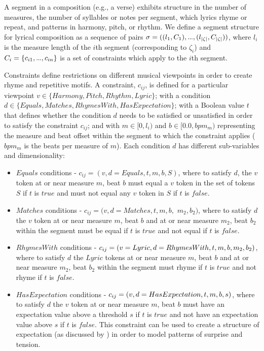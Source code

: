 \documentclass[letterpaper]{article}
\newcommand\mydots{\hbox to .75em{.\hss.\hss.}}
\begin{document}
A segment in a composition (e.g., a verse) exhibits structure in the number of measures, the number of syllables or notes per segment, which lyrics rhyme or repeat, and patterns in harmony, pitch, or rhythm. We define a segment structure for lyrical composition as a sequence of pairs $\sigma = ((l_1,C_1),\mydots,(l_{|\zeta|},C_{|\zeta|}))$, where $l_i$ is the measure length of the $i$th segment (corresponding to $\zeta_i$) and $C_i = \{{c_{i1},\mydots,c_{in}}\}$ is a set of constraints which apply to the $i$th segment.

Constraints define restrictions on different musical viewpoints in order to create rhyme and repetitive motifs. A constraint, $c_{ij}$, is defined for a particular viewpoint $v\in\{Harmony, Pitch, Rhythm, Lyric\}$; with a condition $d\in\{Equals, Matches, RhymesWith, HasExpectation\}$; with a Boolean value $t$ that defines whether the condition $d$ needs to be satisfied or unsatisfied in order to satisfy the constraint $c_{ij}$; and with $m\in[0,l_i)$ and $b\in[0.0,bpm_m)$ representing the measure and beat offset within the segment to which the constraint applies ($bpm_m$ is the beats per measure of $m$). Each condition $d$ has different sub-variables and dimensionality:

\begin{itemize}
\item $Equals$ conditions - $c_{ij} = (v,d=Equals,t,m,b,S)$, where to satisfy $d$, the $v$ token at or near measure $m$, beat $b$ must equal a $v$ token in the set of tokens $S$ if $t$ is $true$ and must not equal any $v$ token in $S$ if $t$ is $false$.
\item $Matches$ conditions - $c_{ij} = (v,d=Matches,t,m,b,$ $m_2,b_2)$, where to satisfy $d$ the $v$ token at or near measure $m$, beat $b$ and at or near measure $m_2$, beat $b_2$ within the segment must be equal if $t$ is $true$ and not equal if $t$ is $false$.
\item $RhymesWith$ conditions - $c_{ij} = (v=Lyric,d=Rhy\-mes\-With,t,m,b,m_2,b_2)$, where to satisfy $d$ the $Lyric$ tokens at or near measure $m$, beat $b$ and at or near measure $m_2$, beat $b_2$ within the segment must rhyme if $t$ is $true$ and not rhyme if $t$ is $false$.
\item $HasExpectation$ conditions - $c_{ij} = (v,d=HasEx\-pectation,t,m,b,s)$, where to satisfy $d$ the $v$ token at or near measure $m$, beat $b$ must have an expectation value above a threshold $s$ if $t$ is $true$ and not have an expectation value above $s$ if $t$ is $false$. This constraint can be used to create a structure of expectation (as discussed by \citeauthor{meyer2008emotion} ) in order to model patterns of surprise and tension.
\end{itemize}
\end{document}
